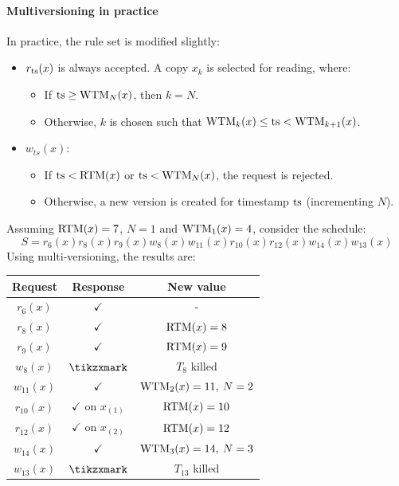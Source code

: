 \paragraph*{Multiversioning in practice}
In practice, the rule set is modified slightly:
\begin{itemize}
    \item $r_{\textnormal{ts}}(x)$ is always accepted. A copy $x_k$ is selected for reading, where:
        \begin{itemize}
            \item If $\textnormal{ts} \geq \textnormal{WTM}_N(x)$, then $k=N$. 
            \item  Otherwise, $k$ is chosen such that $\textnormal{WTM}_k(x) \leq \textnormal{ts} < \textnormal{WTM}_{k+1}(x)$. 
        \end{itemize}
    \item $w_{ts}(x)$:
        \begin{itemize}
            \item If $\textnormal{ts} < \textnormal{RTM}(x)$ or $\textnormal{ts} < \textnormal{WTM}_N(x)$, the request is rejected. 
            \item  Otherwise, a new version is created for timestamp $\textnormal{ts}$ (incrementing $N$).
        \end{itemize}
\end{itemize}
\begin{example}
    Assuming $\textnormal{RTM}(x)=7$, $N=1$ and $\textnormal{WTM}_1(x)=4$, consider the schedule:
    \[S=r_6(x) r_8(x) r_9(x) w_8(x) w_{11}(x) r_{10}(x) r_{12}(x) w_{14}(x) w_{13}(x)\]
    Using multi-versioning, the results are:
    \begin{table}[H]
        \centering
        \begin{tabular}{ccc}
        \textbf{Request} & \textbf{Response}         & \textbf{New value}  \\ \hline
        $r_6(x)$         & $\checkmark$              & -                   \\
        $r_8(x)$         & $\checkmark$              & $\textnormal{RTM}(x)=8$          \\
        $r_9(x)$         & $\checkmark$              & $\textnormal{RTM}(x)=9$          \\
        $w_8(x)$         & $\tikzxmark$              & $T_8$ killed        \\
        $w_{11}(x)$      & $\checkmark$              & $\textnormal{WTM}_2(x)=11,\:N=2$ \\
        $r_{10}(x)$      & $\checkmark$ on $x_{(1)}$ & $\textnormal{RTM}(x)=10$         \\
        $r_{12}(x)$      & $\checkmark$ on $x_{(2)}$ & $\textnormal{RTM}(x)=12$         \\
        $w_{14}(x)$      & $\checkmark$              & $\textnormal{WTM}_3(x)=14,\:N=3$ \\
        $w_{13}(x)$      & $\tikzxmark$              & $T_{13}$ killed
        \end{tabular}
    \end{table}
\end{example}

